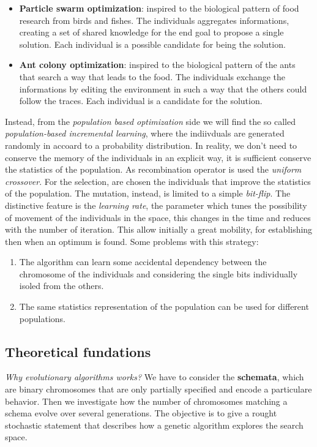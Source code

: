\documentclass{article}
\begin{document}
\begin{itemize}
    \item \textbf{Particle swarm optimization}: inspired to the biological pattern
          of food research from birds and fishes. The individuals aggregates informations,
          creating a set of shared knowledge for the end goal to propose a single solution.
          Each individual is a possible candidate for being the solution.
    \item \textbf{Ant colony optimization}: inspired to the biological pattern of the ants
          that search a way that leads to the food. The individuals exchange the informations
          by editing the environment in such a way that the others could follow the traces.
          Each individual is a candidate for the solution.
\end{itemize}
Instead, from the \textit{population based optimization} side we will find the so called
\textit{population-based incremental learning}, where the indiivduals are generated randomly
in accoard to a probability distribution. In reality, we don't need to conserve the memory of
the individuals in an explicit way, it is sufficient conserve the statistics of the population.
As recombination operator is used the \textit{uniform crossover}. For the selection,
are chosen the individuals that improve the statistics of the population. The mutation, instead,
is limited to a simple \textit{bit-flip}.
\newline\newline
The distinctive feature is the \textit{learning rate}, the parameter which tunes the possibility
of movement of the individuals in the space, this changes in the time and reduces with the number
of iteration. This allow initially a great mobility, for establishing then when an optimum is
found. Some problems with this strategy:
\begin{enumerate}
    \item The algorithm can learn some accidental dependency between the chromosome of the
          individuals and considering the single bits individually isoled from the others.
    \item The same statistics representation of the population can be used for different populations.
\end{enumerate}

\subsection{Theoretical fundations}
\textit{Why evolutionary algorithms works?} We have to consider the \textbf{schemata}, which
are binary chromosomes that are only partially specified and encode a particulare behavior.
Then we investigate how the number of chromosomes matching a schema evolve over several generations.
The objective is to give a rought stochastic statement that describes how a genetic algorithm
explores the search space.
\end{document}
